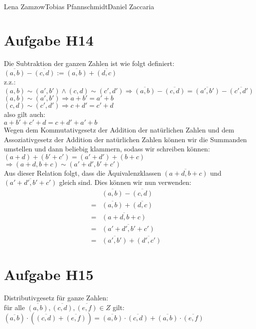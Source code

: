 \documentclass[11pt,a4paper]{article}
\begin{document}
                {Lena Zamzow}{Tobias Pfannschmidt}{Daniel Zaccaria}{}{}


\section*{Aufgabe H14}
Die Subtraktion der ganzen Zahlen ist wie folgt definiert: \\
$\overline{(a,b)} - \overline{(c,d)} := \overline{(a,b)} + \overline{(d,c)}$ \\

z.z.: \\
$ (a,b) \sim (a',b') \land (c, d) \sim (c',d') \Rightarrow \overline{(a,b)} - \overline{(c,d)} = \overline{(a',b')} - \overline{(c',d')}$ \\

$(a,b) \sim (a',b') \Rightarrow a + b' = a' + b$ \\
$(c,d) \sim (c',d') \Rightarrow c + d' = c' + d$ \\
also gilt auch: \\
$ a + b' + c' + d = c + d' + a' + b$ \\
Wegen dem Kommutativgesetz der Addition der natürlichen Zahlen und dem Assoziativgesetz der Addition der natürlichen Zahlen können wir die Summanden umstellen und dann beliebig klammern, sodass wir schreiben können: \\
$ (a+d) + (b'+c') = (a'+d') + (b+c)$
$\Rightarrow (a+d, b+c) \sim (a'+d', b'+c')$ \\
Aus dieser Relation folgt, dass die Äquivalenzklassen $\overline{(a+d,b+c)}$ und $\overline{(a'+d',b'+c')}$ gleich sind. Dies können wir nun verwenden: \\
\begin{align*}
&\overline{(a,b)} - \overline{(c,d)} \\
=& \overline{(a,b)} + \overline{(d,c)}   \tag{Definition Subtraktion der ganzen Zahlen} \\
=& \overline{(a+d,b+c)}   \tag{Definition Addition der ganzen Zahlen}\\
=& \overline{(a'+d',b'+c')}   \tag{siehe oben} \\
=& \overline{(a',b')} + \overline{(d',c')}   
\tag{q.e.d.}
\end{align*}



\section*{Aufgabe H15}
Distributivgesetz für ganze Zahlen: \\
für alle $\overline{(a,b)}, \overline{(c,d)}, \overline{(e,f)} \in Z$ gilt:\\
$ (\overline{a,b}) \cdot ( \overline{(c,d)} + \overline{(e,f)} ) = \overline{(a,b)} \cdot \overline{(c,d)} + \overline{(a,b)} \cdot \overline{(e,f)}$\\
\end{document}
